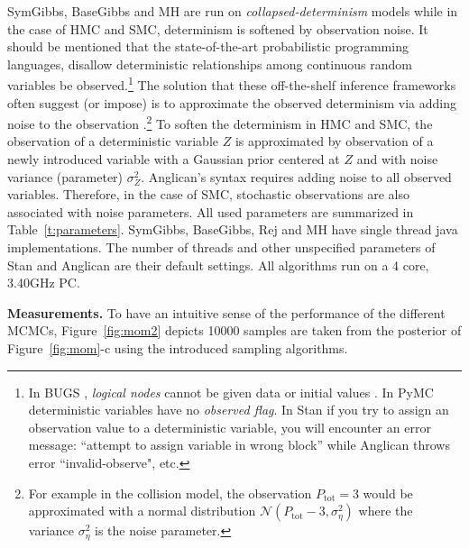 \documentclass[letterpaper]{article}
\begin{document}
SymGibbs, BaseGibbs and MH are run on \emph{collapsed-determinism} models while in the case of HMC and SMC, determinism is softened by observation noise. %
It should be mentioned that 
the state-of-the-art probabilistic programming languages,
disallow deterministic relationships among continuous random variables 
be observed.\footnote{
In BUGS \cite{lunn2009bugs}, \emph{logical nodes} cannot be given data or initial values .
In PyMC \cite{patil2010pymc} deterministic variables have no \emph{observed flag}. 
In Stan \cite{stan-manual:2014} 
if you try to assign an observation value to a deterministic variable, you will encounter an error message: 
``attempt to assign variable in wrong block'' while 
Anglican \cite{wood2014new} throws error ``invalid-observe", etc.}
The solution that these off-the-shelf inference frameworks often suggest (or impose) is to approximate the observed determinism via adding noise to the observation 
\cite{patil2010pymc}.\footnote{
For example in the collision model, the observation $P_{\text{tot}} = 3$  would be 
approximated with a normal distribution
{\footnotesize $\mathcal{N}( P_{\text{tot}} - 3, \sigma_\eta^2)$}  
where the variance $\sigma_\eta^2$ is the noise parameter.
}
%
To soften the determinism in HMC and SMC,
the observation of a deterministic variable $Z$ %
is approximated by observation of a newly introduced variable 
with a Gaussian prior centered at $Z$ and with noise variance (parameter) $\sigma^2_{Z}$. 
Anglican's syntax requires %
adding noise to all observed variables. Therefore, in the case of SMC, stochastic observations are also associated with noise parameters.
All used parameters are summarized in Table~\ref{t:parameters}. 
SymGibbs, BaseGibbs, Rej and MH have single thread java implementations.
The number of threads and other unspecified parameters of Stan and Anglican are their default settings.   
All algorithms run on a 4 core, 3.40GHz PC.%


{\bf Measurements.}
To have an intuitive sense of the performance of the different MCMCs,
Figure~\ref{fig:mom2} depicts 10000 samples are taken from the posterior of 
Figure~\ref{fig:mom}-c using the introduced sampling algorithms. 
\end{document}
